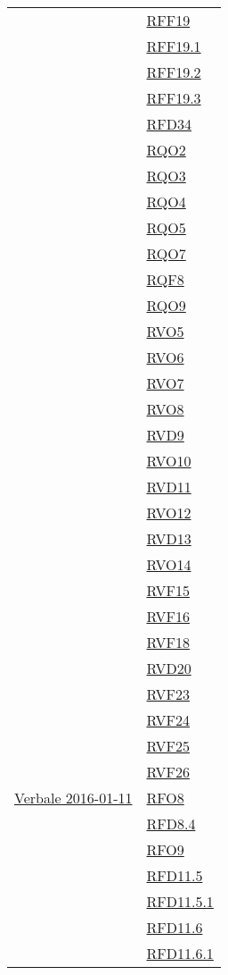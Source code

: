 \begin{longtable}{|>{\centering}m{5cm}|m{5cm}<{\centering}|}
& \hyperlink{RFF19}{RFF19}\\
& \hyperlink{RFF19.1}{RFF19.1}\\
& \hyperlink{RFF19.2}{RFF19.2}\\
& \hyperlink{RFF19.3}{RFF19.3}\\
& \hyperlink{RFD34}{RFD34}\\
& \hyperlink{RQO2}{RQO2}\\
& \hyperlink{RQO3}{RQO3}\\
& \hyperlink{RQO4}{RQO4}\\
& \hyperlink{RQO5}{RQO5}\\
& \hyperlink{RQO7}{RQO7}\\
& \hyperlink{RQF8}{RQF8}\\
& \hyperlink{RQO9}{RQO9}\\
& \hyperlink{RVO5}{RVO5}\\
& \hyperlink{RVO6}{RVO6}\\
& \hyperlink{RVO7}{RVO7}\\
& \hyperlink{RVO8}{RVO8}\\
& \hyperlink{RVD9}{RVD9}\\
& \hyperlink{RVO10}{RVO10}\\
& \hyperlink{RVD11}{RVD11}\\
& \hyperlink{RVO12}{RVO12}\\
& \hyperlink{RVD13}{RVD13}\\
& \hyperlink{RVO14}{RVO14}\\
& \hyperlink{RVF15}{RVF15}\\
& \hyperlink{RVF16}{RVF16}\\
& \hyperlink{RVF18}{RVF18}\\
& \hyperlink{RVD20}{RVD20}\\
& \hyperlink{RVF23}{RVF23}\\
& \hyperlink{RVF24}{RVF24}\\
& \hyperlink{RVF25}{RVF25}\\
& \hyperlink{RVF26}{RVF26}\\ \hline
\hyperlink{Verbale 2016-01-11}{Verbale 2016-01-11} & \hyperlink{RFO8}{RFO8}\\
& \hyperlink{RFD8.4}{RFD8.4}\\
& \hyperlink{RFO9}{RFO9}\\
& \hyperlink{RFD11.5}{RFD11.5}\\
& \hyperlink{RFD11.5.1}{RFD11.5.1}\\
& \hyperlink{RFD11.6}{RFD11.6}\\
& \hyperlink{RFD11.6.1}{RFD11.6.1}\\

\end{longtable}
